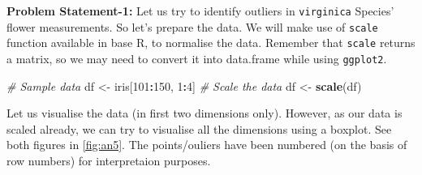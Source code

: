 \documentclass[
]{book}
\newenvironment{Shaded}{\begin{snugshade}}{\end{snugshade}}
\newcommand{\CommentTok}[1]{\textcolor[rgb]{0.56,0.35,0.01}{\textit{#1}}}
\newcommand{\DecValTok}[1]{\textcolor[rgb]{0.00,0.00,0.81}{#1}}
\newcommand{\FunctionTok}[1]{\textcolor[rgb]{0.13,0.29,0.53}{\textbf{#1}}}
\newcommand{\NormalTok}[1]{#1}
\newcommand{\OtherTok}[1]{\textcolor[rgb]{0.56,0.35,0.01}{#1}}
\newcommand{\SpecialCharTok}[1]{\textcolor[rgb]{0.81,0.36,0.00}{\textbf{#1}}}
\begin{document}
\textbf{Problem Statement-1:} Let us try to identify outliers in \texttt{virginica} Species' flower measurements. So let's prepare the data. We will make use of \texttt{scale} function available in base R, to normalise the data. Remember that \texttt{scale} returns a matrix, so we may need to convert it into data.frame while using \texttt{ggplot2}.

\begin{Shaded}
\begin{Highlighting}[]
\CommentTok{\# Sample data}
\NormalTok{df }\OtherTok{\textless{}{-}}\NormalTok{ iris[}\DecValTok{101}\SpecialCharTok{:}\DecValTok{150}\NormalTok{, }\DecValTok{1}\SpecialCharTok{:}\DecValTok{4}\NormalTok{]}
\CommentTok{\#  Scale the data}
\NormalTok{df }\OtherTok{\textless{}{-}} \FunctionTok{scale}\NormalTok{(df)}
\end{Highlighting}
\end{Shaded}

Let us visualise the data (in first two dimensions only). However, as our data is scaled already, we can try to visualise all the dimensions using a boxplot. See both figures in \ref{fig:an5}. The points/ouliers have been numbered (on the basis of row numbers) for interpretaion purposes.
\end{document}
